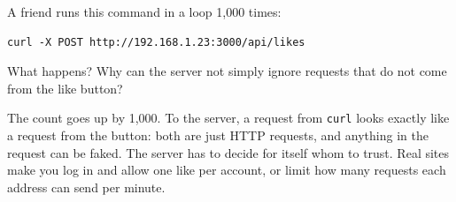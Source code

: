 \begin{Exercise}[title={Cheating the Count}, label=cj_cheat]
A friend runs this command in a loop 1,000 times:
\begin{verbatim}
curl -X POST http://192.168.1.23:3000/api/likes
\end{verbatim}
What happens?
Why can the server not simply ignore requests that do not come from the like button?
\end{Exercise}
\begin{Answer}[ref=cj_cheat]
The count goes up by 1,000. To the server, a request from \verb|curl| looks exactly like a request from the
button: both are just HTTP requests, and anything in the request can be faked. The server has to decide
for itself whom to trust. Real sites make you log in and allow one like per account, or limit how many
requests each address can send per minute.
\end{Answer}
